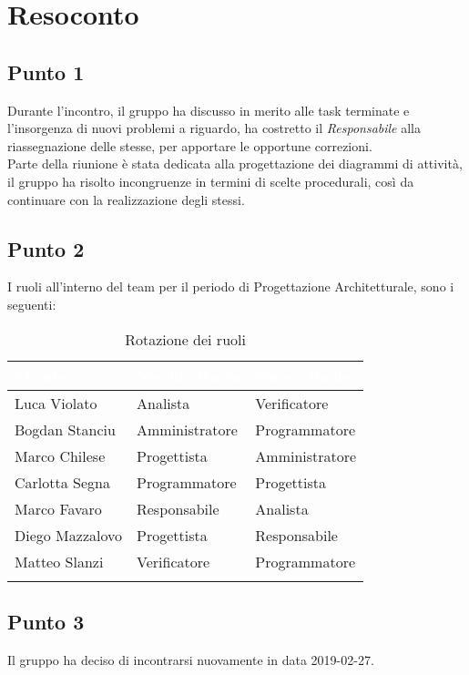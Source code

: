 \section{Resoconto}

\subsection{Punto 1} 
Durante l'incontro, il gruppo ha discusso in merito alle task terminate e l'insorgenza di nuovi problemi a riguardo, ha costretto il \textit{Responsabile} alla riassegnazione delle stesse, per apportare le opportune correzioni. \-\\
Parte della riunione è stata dedicata alla progettazione dei diagrammi di attività, il gruppo ha risolto incongruenze in termini di scelte procedurali, così da continuare con la realizzazione degli stessi.


\subsection{Punto 2}
I ruoli all'interno del team per il periodo di Progettazione Architetturale, sono i seguenti:

\begin{center}
\begin{longtable}[c]{|m{}|m{}|m{}|} 
\hline
\rowcolor{bluelogo}\textbf{\textcolor{white}{Membro}} & \textbf{\textcolor{white}{Vecchio Ruolo}} & \textbf{\textcolor{white}{Nuovo Ruolo}}\\
\hline
\hline
Luca Violato & Analista & Verificatore\\
\hline
\rowcolor{grigio}Bogdan Stanciu & Amministratore & Programmatore\\
\hline
Marco Chilese & Progettista & Amministratore\\
\hline
\rowcolor{grigio}Carlotta Segna & Programmatore & Progettista\\
\hline
Marco Favaro & Responsabile & Analista\\
\hline
\rowcolor{grigio} Diego Mazzalovo & Progettista & Responsabile\\
\hline
Matteo Slanzi & Verificatore & Programmatore\\
\hline
\caption{Rotazione dei ruoli}
\end{longtable}
\end{center}

\subsection{Punto 3}
Il gruppo ha deciso di incontrarsi nuovamente in data 2019-02-27.
